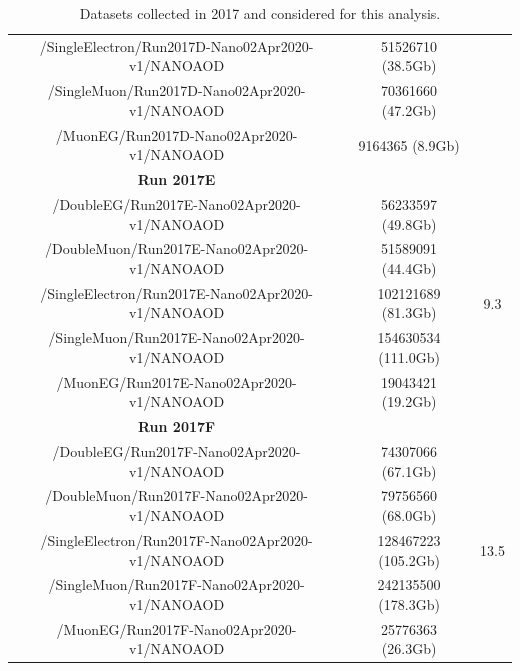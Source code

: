 \documentclass[a4paper, 10pt, openright]{report}
\begin{document}
\begin{appendices}
\begin{table}
\begin{center}
{\begin{tabular}{ c|c|c }
/SingleElectron/Run2017D-Nano02Apr2020-v1/NANOAOD & 51526710 (38.5Gb) & \\
/SingleMuon/Run2017D-Nano02Apr2020-v1/NANOAOD & 70361660 (47.2Gb) & \\
 /MuonEG/Run2017D-Nano02Apr2020-v1/NANOAOD & 9164365 (8.9Gb) & \\
 \hline
 \textbf{Run 2017E} & & \\
/DoubleEG/Run2017E-Nano02Apr2020-v1/NANOAOD & 56233597 (49.8Gb) & \multirow{ 5}{*}{9.3} \\
/DoubleMuon/Run2017E-Nano02Apr2020-v1/NANOAOD & 51589091 (44.4Gb) & \\
/SingleElectron/Run2017E-Nano02Apr2020-v1/NANOAOD & 102121689 (81.3Gb) & \\
/SingleMuon/Run2017E-Nano02Apr2020-v1/NANOAOD & 154630534 (111.0Gb) & \\
/MuonEG/Run2017E-Nano02Apr2020-v1/NANOAOD & 19043421 (19.2Gb) & \\
 \hline
\textbf{Run 2017F} & & \\ 
/DoubleEG/Run2017F-Nano02Apr2020-v1/NANOAOD & 74307066 (67.1Gb) & \multirow{ 5}{*}{13.5} \\
/DoubleMuon/Run2017F-Nano02Apr2020-v1/NANOAOD & 79756560 (68.0Gb) & \\
/SingleElectron/Run2017F-Nano02Apr2020-v1/NANOAOD & 128467223 (105.2Gb) & \\
/SingleMuon/Run2017F-Nano02Apr2020-v1/NANOAOD & 242135500 (178.3Gb) \\
 /MuonEG/Run2017F-Nano02Apr2020-v1/NANOAOD & 25776363 (26.3Gb) & \\
 \hline
\end{tabular}
}
\caption{Datasets collected in 2017 and considered for this analysis.}
\label{table:Data2017}
\end{center}
\end{table}


\end{appendices}
\end{document}
